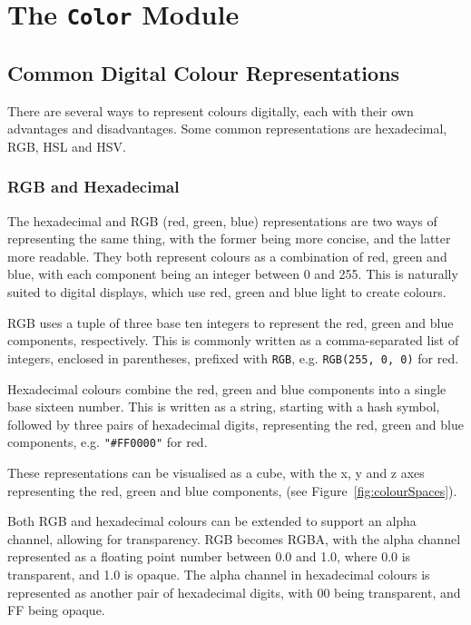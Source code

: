 \documentclass[../main.tex]{subfiles}
\begin{document}
    \section{The \texttt{Color}
        Module}

            \subsection{Common Digital Colour Representations}
                There are several ways to represent colours digitally, each with their own
                advantages and disadvantages.
        Some common representations are hexadecimal, RGB, HSL and HSV.

        \subsubsection{RGB and Hexadecimal}
            The hexadecimal and RGB (red, green, blue) representations are two ways of
                representing the same thing, with the former being more concise, and the latter
                more readable.
            They both represent colours as a combination of red, green and blue, with each
                component being an integer between 0 and 255.
            This is naturally suited to digital displays, which use red, green and blue
                light to create colours.

            RGB uses a tuple of three base ten integers to represent the red, green and
                blue components, respectively.
            This is commonly written as a comma-separated list of integers, enclosed in
                parentheses, prefixed with \texttt{RGB}, e.g. \texttt{RGB(255, 0, 0)} for red.

            Hexadecimal colours combine the red, green and blue components into a single
                base sixteen number.
            This is written as a string, starting with a hash symbol, followed by three
                pairs of hexadecimal digits, representing the red, green and blue components,
                e.g. \texttt{"\#FF0000"} for red.

            These representations can be visualised as a cube, with the x, y and z axes
                representing the red, green and blue components, (see
                Figure~\ref{fig:colourSpaces}).

            Both RGB and hexadecimal colours can be extended to support an alpha channel,
                allowing for transparency.
            RGB becomes RGBA, with the alpha channel represented as a floating point number
                between 0.0 and 1.0, where 0.0 is transparent, and 1.0 is opaque.
            The alpha channel in hexadecimal colours is represented as another pair of
                hexadecimal digits, with 00 being transparent, and FF being opaque.
\end{document}
